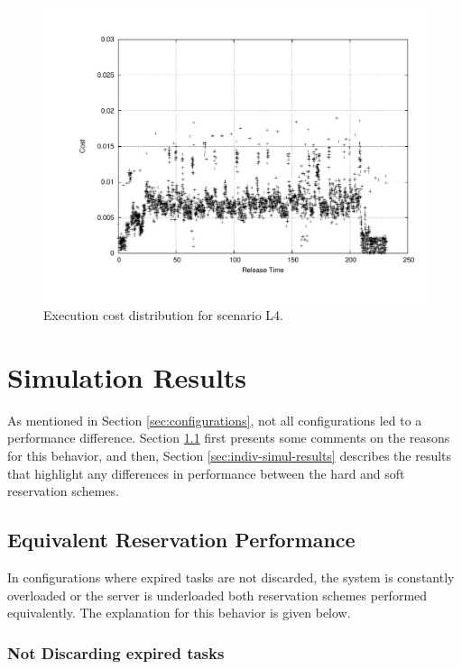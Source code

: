 \documentclass[12pt]{article}
\begin{document}
\begin{figure}[h!t]
  \centering
  \includegraphics[scale=0.26]{trace-eve}
  \caption{Execution cost distribution for scenario L4.}
  \label{fig:plotl4}
\end{figure}

\section{Simulation Results}
\label{sec:simulation-results}

As mentioned in Section \ref{sec:configurations}, not all
configurations led to a performance difference. Section
\ref{sec:noDifference} first presents some comments on the reasons for
this behavior, and then, Section \ref{sec:indiv-simul-results}
describes the results that highlight any differences in performance
between the hard and soft reservation schemes.

\subsection{Equivalent Reservation Performance}
\label{sec:noDifference}

In configurations where expired tasks are not discarded, the system is
constantly overloaded or the server is underloaded both reservation
schemes performed equivalently. The explanation for this behavior is
given below.

\subsubsection{Not Discarding expired tasks}
\label{sec:disc-expir-tasks}
\end{document}
